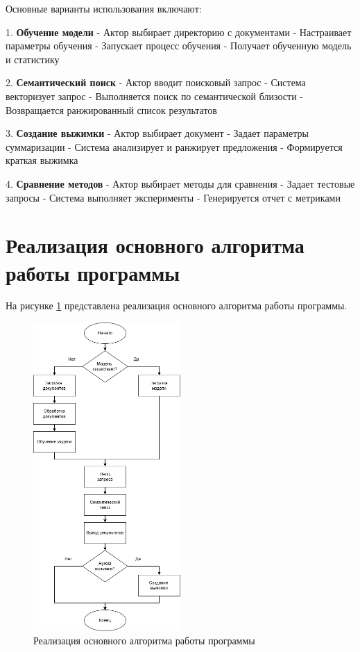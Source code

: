 Основные варианты использования включают:

1. \textbf{Обучение модели}
- Актор выбирает директорию с документами
- Настраивает параметры обучения
- Запускает процесс обучения
- Получает обученную модель и статистику

2. \textbf{Семантический поиск}
- Актор вводит поисковый запрос
- Система векторизует запрос
- Выполняется поиск по семантической близости
- Возвращается ранжированный список результатов

3. \textbf{Создание выжимки}
- Актор выбирает документ
- Задает параметры суммаризации
- Система анализирует и ранжирует предложения
- Формируется краткая выжимка

4. \textbf{Сравнение методов}
- Актор выбирает методы для сравнения
- Задает тестовые запросы
- Система выполняет эксперименты
- Генерируется отчет с метриками

\section{Реализация основного алгоритма работы программы}
На рисунке \ref{algoritm} представлена реализация основного алгоритма работы программы.
\begin{figure}[H]
	\centering
	\includegraphics[width=0.5\textwidth]{images/ALGORITM.png}
	\caption{Реализация основного алгоритма работы программы}
	\label{algoritm}
\end{figure}

